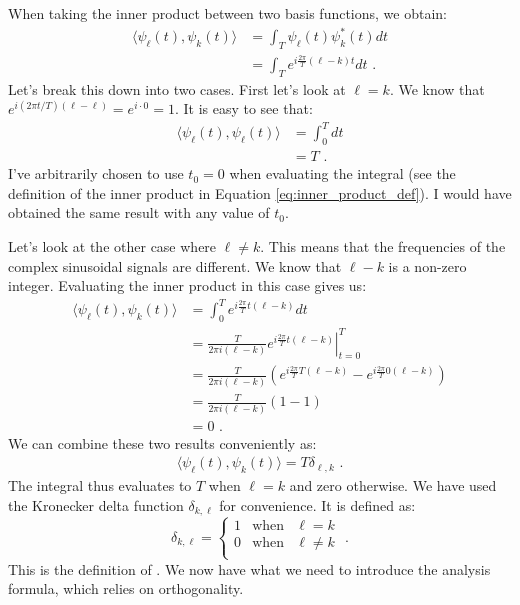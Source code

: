 When taking the inner product between two basis functions, we obtain:
\begin{align}
  \langle \psi_\ell(t), \psi_k(t) \rangle & = \int_T \psi_\ell(t) \psi_k^*(t) dt            \\
                                          & = \int_T e^{i\frac{2\pi}{T}(\ell-k) t} dt \,\,.
\end{align}
Let's break this down into two cases. First let's look at $\ell=k$. 
We know that $e^{i(2\pi t/T)(\ell-\ell)}=e^{i \cdot 0} = 1$. It is easy to see that:
\begin{align}
  \langle \psi_\ell(t), \psi_\ell(t) \rangle & = \int_{0}^T dt \\
                                             & = T \,\,.
\end{align}
I've arbitrarily chosen to use $t_0=0$ when evaluating the integral (see the definition of the
inner product in Equation \ref{eq:inner_product_def}). I would have obtained the same result with any value of $t_0$.

Let's look at the other case where $\ell \ne k$. This means that the frequencies of the complex
sinusoidal signals are different. We know that $\ell - k$ is a non-zero integer.
Evaluating the inner product in this case gives us:
\begin{align}
  \langle \psi_\ell(t), \psi_k(t) \rangle & = \int_0^T  e^{i\frac{2\pi}{T}t(\ell-k)} dt                                                           \\
                                          & = \left.\frac{T}{2\pi i (\ell-k)} e^{i\frac{2\pi}{T}t(\ell-k)} \right\vert_{t=0}^{T}                  \\
                                          & = \frac{T}{2\pi i (\ell-k)}\left( e^{i\frac{2\pi}{T}T(\ell-k)} - e^{i\frac{2\pi}{T}0(\ell-k)} \right) \\
                                          & = \frac{T}{2\pi i (\ell-k)}( 1 - 1 )                                                                  \\
                                          & = 0 \,\,.
\end{align}
We can combine these two results conveniently as:
\begin{align}
  \langle \psi_\ell(t), \psi_k(t) \rangle = T\delta_{\ell,k} \,\,.
\end{align}
The integral thus evaluates to $T$ when $\ell=k$ and zero
otherwise. We have used the Kronecker delta function $\delta_{k,\ell}$
for convenience. It is defined as:
\begin{equation}
  \delta_{k,\ell} = \left\{
  \begin{array}{rcr}
    1 & \mathrm{when} & \ell=k     \\
    0 & \mathrm{when} & \ell \ne k \\
  \end{array}\right.\,\,.
\end{equation}
This is the definition of \emph{}. We now have what we
need to introduce the analysis formula, which relies on orthogonality.

